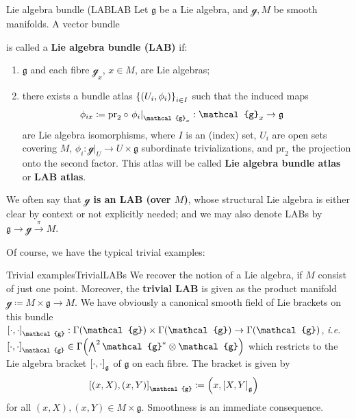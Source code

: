 \documentclass[reqno,a4paper,oneside]{amsart}
\theoremstyle{plain}
\theoremstyle{remark}
\theoremstyle{definition}
\begin{document}
\begin{definitions}{Lie algebra bundle (LAB}{LAB}
Let $\mathfrak{g}$ be a Lie algebra, and $\mathcal{g}, M$ be smooth manifolds. A vector bundle
\begin{center}
\end{center}
is called a \textbf{Lie algebra bundle (LAB)} if:
\begin{enumerate}
	\item $\mathfrak{g}$ and each fibre $\mathcal{g}_x$, $x \in M$, are Lie algebras;
	\item there exists a bundle atlas $\mleft\{ \mleft( U_i, \phi_i \mright) \mright\}_{i \in I}$ such that the induced maps
	\begin{align*}
	\phi_{ix}
	&\coloneqq
	\mathrm{pr}_2 \circ \mleft. \phi_i\mright|_{\mathcal{g}_x}: \mathcal{g}_x \to \mathfrak{g}
	\end{align*}
	are Lie algebra isomorphisms, where $I$ is an (index) set, $U_i$ are open sets covering $M$, $\phi_i: \mathcal{g}|_U \to U \times \mathfrak{g}$ subordinate trivializations, and $\mathrm{pr}_2$ the projection onto the second factor. This atlas will be called \textbf{Lie algebra bundle atlas} or \textbf{LAB atlas}.
\end{enumerate}
We often say that \textbf{$\mathcal{g}$ is an LAB (over $M$)}, whose structural Lie algebra is either clear by context or not explicitly needed; and we may also denote LABs by $\mathfrak{g} \to \mathcal{g} \stackrel{\pi}{\to} M$.
\end{definitions}

Of course, we have the typical trivial examples:

\begin{examples}{Trivial examples}{TrivialLABs}
We recover the notion of a Lie algebra, if $M$ consist of just one point. Moreover, the \textbf{trivial LAB} is given as the product manifold $\mathcal{g} \coloneqq M \times \mathfrak{g} \to M$. We have obviously a canonical smooth field of Lie brackets on this bundle $\mleft[ \cdot, \cdot \mright]_{\mathcal{g}}: \Gamma(\mathcal{g}) \times \Gamma(\mathcal{g}) \to \Gamma(\mathcal{g})$, \textit{i.e.}\ $\mleft[ \cdot, \cdot \mright]_{\mathcal{g}} \in \Gamma\mleft(\bigwedge^2 \mathcal{g}^* \otimes \mathcal{g} \mright)$ which restricts to the Lie algebra bracket $\mleft[ \cdot, \cdot \mright]_{\mathfrak{g}}$ of $\mathfrak{g}$ on each fibre. The bracket is given by
\begin{align*}
\mleft[ (x, X), (x, Y) \mright]_{\mathcal{g}}
&\coloneqq
\mleft( x, \mleft[ X, Y \mright]_{\mathfrak{g}} \mright)
\end{align*}
for all $(x, X), (x, Y) \in M \times \mathfrak{g}$. Smoothness is an immediate consequence.
\end{examples}
\end{document}
